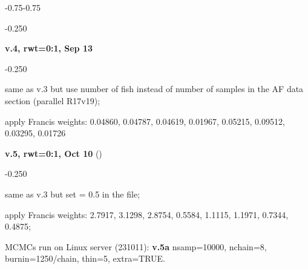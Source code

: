 \begin{itemize_csas}{-0.75}{-0.75}
\begin{itemize_csas}{-0.25}{0}
	\end{itemize_csas}
	\item \textbf{v.4, rwt=0:1, Sep 13}
	\begin{itemize_csas}{-0.25}{0}
		\item same as v.3 but use number of fish instead of number of samples in the AF data section (parallel R17v19);
		\item apply Francis weights: 0.04860, 0.04787, 0.04619, 0.01967, 0.05215, 0.09512, 0.03295, 0.01726
		\item {}
	\end{itemize_csas}
	\item \textbf{v.5, rwt=0:1, Oct 10} ()
	\begin{itemize_csas}{-0.25}{0}
		\item same as v.3 but set  = 0.5 in the  file;
		\item apply Francis weights: 2.7917, 3.1298, 2.8754, 0.5584, 1.1115, 1.1971, 0.7344, 0.4875;
		\item {}
		\item MCMCs run on Linux server (231011): \textbf{v.5a} nsamp=10000, nchain=8, burnin=1250/chain, thin=5, extra=TRUE.
	\end{itemize_csas}
\end{itemize_csas}

